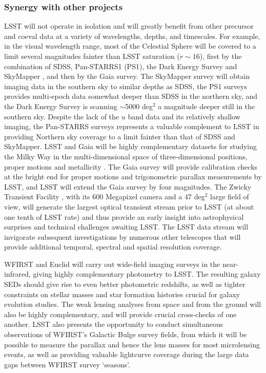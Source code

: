 \subsubsection{  Synergy with other projects }

LSST will not operate in isolation and will greatly benefit from other precursor and coeval
data at a variety of wavelengths, depths, and timescales. For example,
in the visual wavelength range, most of the Celestial
Sphere will be covered to a limit several magnitudes fainter than LSST saturation
($r\sim16$), first by the combination of SDSS, Pan-STARRS1 (PS1), the
Dark Energy Survey \citep{2016MNRAS.460.1270D} and SkyMapper
\citep{2007PASA...24....1K},
and then by the Gaia survey. The SkyMapper survey will obtain imaging data in the southern
sky to similar depths as SDSS, the PS1 surveys provides multi-epoch
data somewhat deeper
than SDSS in the northern sky, and the Dark Energy Survey
 is scanning
$\sim$5000 deg$^2$ a magnitude deeper still in the southern sky. Despite the lack of
the $u$ band data and its relatively shallow imaging, the Pan-STARRS surveys
represents a valuable complement to LSST in providing Northern sky coverage to a limit
fainter than that of SDSS and SkyMapper. LSST and Gaia will
be highly complementary datasets for studying the Milky Way in the multi-dimensional space of
three-dimensional positions, proper motions and metallicity \citep{2012ARA&A..50..251I}.
The Gaia survey will provide calibration checks at the bright end for proper
motions and trigonometric parallax measurements by LSST, and LSST will extend the
Gaia survey by four magnitudes. The Zwicky Transient Facility \cite[e.g.,][]{2018RTSRE...1..329L},
with its 600 Megapixel camera and a 47 deg$^2$ large field of view, will generate the largest
optical transient stream prior to LSST (at about one tenth of LSST rate) and thus provide
an early insight into astrophysical surprises and technical challenges awaiting LSST.
The LSST data stream will invigorate subsequent investigations by numerous other telescopes
that will provide additional temporal, spectral and spatial resolution coverage.

WFIRST and Euclid will carry out wide-field imaging surveys in the
near-infrared, giving highly complementary photometry to LSST.  The
resulting galaxy SEDs should give rise to even better photometric
redshifts, as well as tighter constraints on stellar masses and star
formation histories crucial for galaxy evolution studies.  The weak
lensing analyses from space and from the ground will also be highly
complementary, and will provide crucial cross-checks of one another.
LSST also presents the opportunity to conduct simultaneous observations
of WFIRST's Galactic Bulge survey fields, from which it will be possible to
measure the parallax and hence the lens masses for most microlensing
events, as well as providing valuable lightcurve coverage during the large
data gaps between WFIRST survey `seasons'.

